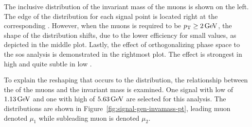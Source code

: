 The inclusive distribution of the invariant mass of the muons \mmumu is shown on the left. The edge of the \mmumu distribution for each signal point is located right at the corresponding \dm. However, when the muons \pt is required to be $p_{\mathrm{T}}\geq 2\,\text{Ge\hspace{-.08em}V}$, the shape of the distribution shifts, due to the lower efficiency for small \dm values, as depicted in the middle plot. Lastly, the effect of orthogonalizing phase space to the \gls{sos} analysis is demonstrated in the rightmost plot. The effect is strongest in high \dm and quite subtle in low \dm.

To explain the reshaping that occurs to the \mmumu distribution, the relationship between the \pt of the muons and the invariant mass is examined. One signal with low \dm of $1.13\,\text{Ge\hspace{-.08em}V}$ and one with high \dm of $5.63\,\text{Ge\hspace{-.08em}V}$ are selected for this analysis. The distributions are shown in Figure~\ref{fig:signal-gen-invamass-pt}, leading muon denoted $\mu_1$ while subleading muon is denoted $\mu_2$.

